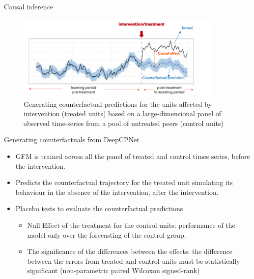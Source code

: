 \documentclass{beamer}
\begin{document}
\begin{frame}{Causal inference}
\begin{figure}[htbp]
\centerline{\includegraphics[width=0.90\textwidth]{images/causal}}
\caption{ \scriptsize Generating counterfactual predictions for the units affected by intervention (treated units) based on a large-dimensional panel of observed time-series from a pool of untreated peers (control units)}
\label{causal}
\end{figure}
\end{frame}


\begin{frame}{Generating counterfactuals from DeepCPNet}
	\begin{itemize}
	\item GFM is trained across all the panel of treated and control times series, before the intervention.
	\vspace{2mm}
	\item Predicts the counterfactual trajectory for the treated unit simulating its behaviour in the absence of the intervention, after the intervention.
	\vspace{2mm}
	\item Placebo tests to evaluate the counterfactual predictions
	\begin{itemize}\color{blue}
		\item Null Effect of the treatment for the control units: performance of the model only over the forecasting of the control group.
		\item The significance of the differences between the effects: the difference between the errors from treated and control units must be statistically significant (non-parametric paired Wilcoxon signed-rank)
	\end{itemize}
\end{itemize}
\end{frame} 
\end{document}
